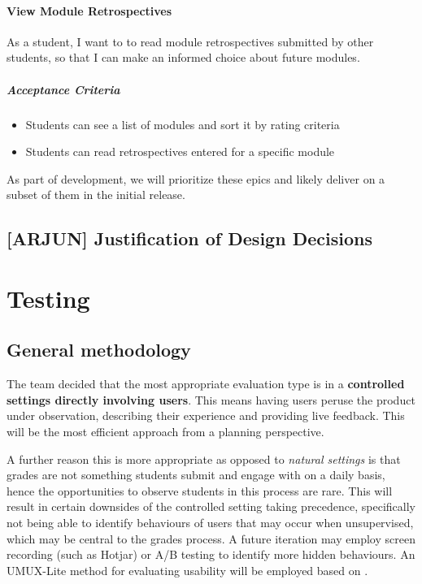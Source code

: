 \paragraph{View Module Retrospectives} As a student, I want to to read module retrospectives submitted by other students, so that I can make an informed choice about future modules.
\subparagraph{Acceptance Criteria}
\begin{itemize}
    \item Students can see a list of modules and sort it by rating criteria
    \item Students can read retrospectives entered for a specific module
\end{itemize}

As part of development, we will prioritize these epics and likely deliver on a subset of them in the initial release.

\subsection{[ARJUN] Justification of Design Decisions}\label{sec:justif}


\section{Testing}\label{sec:testing}

\subsection{General methodology}
The team decided that the most appropriate evaluation type is in a \textbf{controlled settings directly involving users}. This means having users peruse the product under observation, describing their experience and providing live feedback. This will be the most efficient approach from a planning perspective.

A further reason this is more appropriate as opposed to \textit{natural settings} is that grades are not something students submit and engage with on a daily basis, hence the opportunities to observe students in this process are rare. This will result in certain downsides of the controlled setting taking precedence, specifically not being able to identify behaviours of users that may occur when unsupervised, which may be central to the grades process. A future iteration may employ screen recording (such as Hotjar) or A/B testing to identify more hidden behaviours. An UMUX-Lite method for evaluating usability will be employed based on \cite{lewis}.

